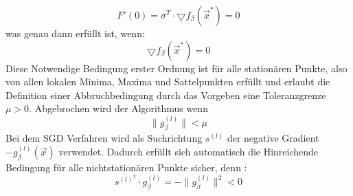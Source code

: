 \begin{displaymath}
F'(0)=\sigma^T \cdot \bigtriangledown f_\beta(\vec x^*) = 0
\end{displaymath}
was genau dann erfüllt ist, wenn:
\begin{displaymath}
\bigtriangledown f_\beta(\vec x^*)=0
\end{displaymath}
Diese Notwendige Bedingung erster Ordnung ist für alle stationären Punkte, also von allen lokalen Minima, Maxima und Sattelpunkten erfüllt und erlaubt die Definition einer Abbruchbedingung durch das Vorgeben eine Toleranzgrenze $\mu > 0$. Abgebrochen wird der Algorithmus wenn 
\begin{displaymath}
\parallel g_\beta^{(l)} \parallel < \mu
\end{displaymath}
Bei dem SGD Verfahren wird als Suchrichtung $s^{(l)}$ der negative Gradient $-g_\beta^{(l)}(\vec x)$ verwendet. Dadurch erfüllt sich  automatisch die Hinreichende Bedingung für alle nichtstationären Punkte sicher, denn \cite{PAPA}: 
\begin{displaymath}
s^{(l)^T} \cdot g_\beta^{(l)} = - \parallel g_\beta^{(l)} \parallel^2 < 0
\end{displaymath}
